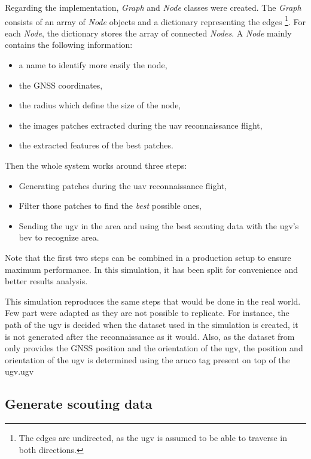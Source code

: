 Regarding the implementation, \textit{Graph} and \textit{Node} classes were created.
The \textit{Graph} consists of an array of \textit{Node} objects and a dictionary representing the edges
\footnote{The edges are undirected, as the \gls{ugv} is assumed to be able to traverse in both directions.}.
For each \textit{Node}, the dictionary stores the array of connected \textit{Nodes}.
A \textit{Node} mainly contains the following information:
\begin{itemize}
    \item a name to identify more easily the node,
    \item the GNSS coordinates,
    \item the radius which define the size of the node,
    \item the images patches extracted during the \gls{uav} reconnaissance flight,
    \item the extracted features of the best patches.
\end{itemize}

Then the whole system works around three steps:
\begin{itemize}
    \item Generating patches during the \gls{uav} reconnaissance flight,
    \item Filter those patches to find the \textit{best} possible ones,
    \item Sending the \gls{ugv} in the area and using the best scouting data with the \gls{ugv}'s \gls{bev} to recognize area.
\end{itemize}
Note that the first two steps can be combined in a production setup to ensure maximum performance.
In this simulation, it has been split for convenience and better results analysis.

This simulation reproduces the same steps that would be done in the real world.
Few part were adapted as they are not possible to replicate.
For instance, the path of the \gls{ugv} is decided when the dataset used in the simulation is created, it is not generated after the reconnaissance as it would.
Also, as the dataset from~\cite{fortin_uav-assisted_2024} only provides the GNSS position and the orientation of the \gls{ugv},
the position and orientation of the \gls{ugv} is determined using the aruco tag present on top of the \gls{ugv}.ugv

\subsection{Generate scouting data}

